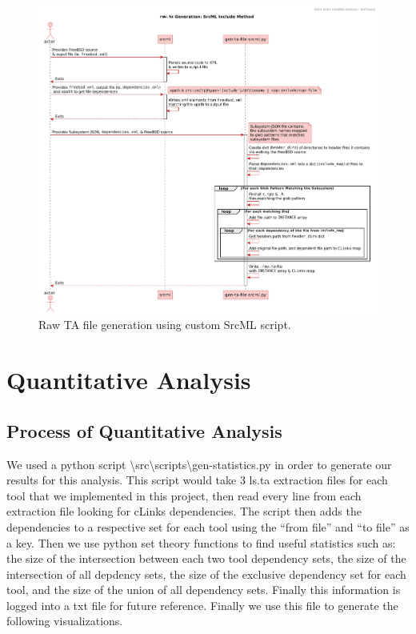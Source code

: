 \documentclass[12pt, dvipsnames, a4paper]{article}
\begin{document}
\begin{figure}[!htb]
	\center
	\includegraphics[width = 450pt]{assets/sequence_diagrams/srcml_includes.pdf}
	\caption{Raw TA file generation using custom SrcML script.}
\end{figure}

\section{Quantitative Analysis}
\subsection{Process of Quantitative Analysis}

We used a python script \textbackslash src\textbackslash scripts\textbackslash gen-statistics.py in order to generate our results for this analysis. This script would take 3 ls.ta extraction files for each tool that we implemented in this project, then read every line from each extraction file looking for cLinks dependencies. The script then adds the dependencies to a respective set for each tool using the “from file” and “to file” as a key. Then we use python set theory functions to find useful statistics such as: the size of the intersection between each two tool dependency sets, the size of the intersection of all depdency sets, the size of the exclusive dependency set for each tool, and the size of the union of all dependency sets. Finally this information is logged into a txt file for future reference. Finally we use this file to generate the following visualizations.
\end{document}

